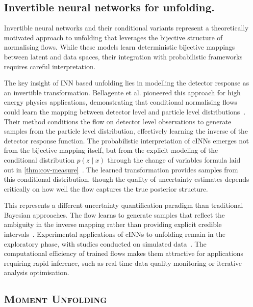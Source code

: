 \subsection{Invertible neural networks for unfolding.}
    Invertible neural networks and their conditional variants represent a theoretically motivated approach to unfolding that leverages the bijective structure of normalising flows.
    While these models learn deterministic bijective mappings between latent and data spaces, their integration with probabilistic frameworks requires careful interpretation.
    
    The key insight of INN based unfolding lies in modelling the detector response as an invertible transformation.
    Bellagente et al. pioneered this approach for high energy physics applications, demonstrating that conditional normalising flows could learn the mapping between detector level and particle level distributions~\cite{bellagente_how_2020}.
    Their method conditions the flow on detector level observations to generate samples from the particle level distribution, effectively learning the inverse of the detector response function.
    The probabilistic interpretation of cINNs emerges not from the bijective mapping itself, but from the explicit modeling of the conditional distribution $p(z\mid x)$ through the change of variables formula laid out in \cref{thm:cov-measure}~\cite{Backes:2022sph}.
    The learned transformation provides samples from this conditional distribution, though the quality of uncertainty estimates depends critically on how well the flow captures the true posterior structure.
    
    This represents a different uncertainty quantification paradigm than traditional Bayesian approaches.
    The flow learns to generate samples that reflect the ambiguity in the inverse mapping rather than providing explicit credible intervals~\cite{AnanthaPadmanabha2021SolvingNetworks}.
    Experimental applications of cINNs to unfolding remain in the exploratory phase, with studies conducted on simulated data~\cite{Backes:2022sph}.
    The computational efficiency of trained flows makes them attractive for applications requiring rapid inference, such as real-time data quality monitoring or iterative analysis optimisation.

    \subsection{\textsc{Moment Unfolding}}
    
